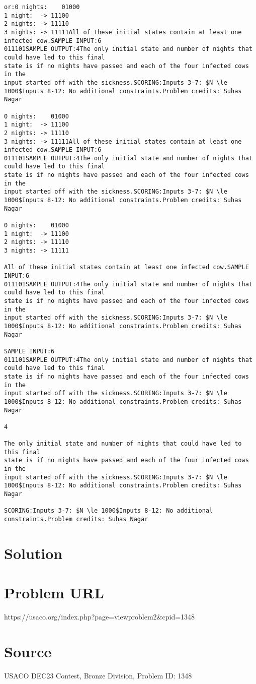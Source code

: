 \documentclass[12pt]{article}
\begin{document}
\begin{verbatim}
or:0 nights:    01000
1 night:  -> 11100
2 nights: -> 11110
3 nights: -> 11111All of these initial states contain at least one infected cow.SAMPLE INPUT:6
011101SAMPLE OUTPUT:4The only initial state and number of nights that could have led to this final
state is if no nights have passed and each of the four infected cows in the
input started off with the sickness.SCORING:Inputs 3-7: $N \le 1000$Inputs 8-12: No additional constraints.Problem credits: Suhas Nagar

0 nights:    01000
1 night:  -> 11100
2 nights: -> 11110
3 nights: -> 11111All of these initial states contain at least one infected cow.SAMPLE INPUT:6
011101SAMPLE OUTPUT:4The only initial state and number of nights that could have led to this final
state is if no nights have passed and each of the four infected cows in the
input started off with the sickness.SCORING:Inputs 3-7: $N \le 1000$Inputs 8-12: No additional constraints.Problem credits: Suhas Nagar

0 nights:    01000
1 night:  -> 11100
2 nights: -> 11110
3 nights: -> 11111

All of these initial states contain at least one infected cow.SAMPLE INPUT:6
011101SAMPLE OUTPUT:4The only initial state and number of nights that could have led to this final
state is if no nights have passed and each of the four infected cows in the
input started off with the sickness.SCORING:Inputs 3-7: $N \le 1000$Inputs 8-12: No additional constraints.Problem credits: Suhas Nagar

SAMPLE INPUT:6
011101SAMPLE OUTPUT:4The only initial state and number of nights that could have led to this final
state is if no nights have passed and each of the four infected cows in the
input started off with the sickness.SCORING:Inputs 3-7: $N \le 1000$Inputs 8-12: No additional constraints.Problem credits: Suhas Nagar

4

The only initial state and number of nights that could have led to this final
state is if no nights have passed and each of the four infected cows in the
input started off with the sickness.SCORING:Inputs 3-7: $N \le 1000$Inputs 8-12: No additional constraints.Problem credits: Suhas Nagar

SCORING:Inputs 3-7: $N \le 1000$Inputs 8-12: No additional constraints.Problem credits: Suhas Nagar
\end{verbatim}

\section*{Solution}


\section*{Problem URL}
https://usaco.org/index.php?page=viewproblem2&cpid=1348

\section*{Source}
USACO DEC23 Contest, Bronze Division, Problem ID: 1348
\end{document}
